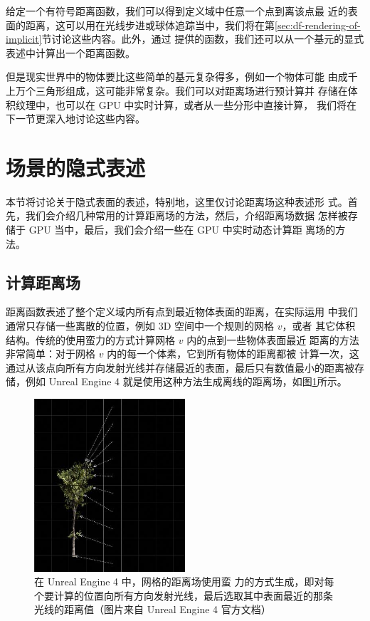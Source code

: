 给定一个有符号距离函数，我们可以得到定义域中任意一个点到离该点最 近的表面的距离，这可以用在光线步进或球体追踪当中，我们将在第\ref{sec:df-rendering-of-implicit}节讨论这些内容。此外，通过 \cite{w:distance-function} 提供的函数，我们还可以从一个基元的显式 表述中计算出一个距离函数。

但是现实世界中的物体要比这些简单的基元复杂得多，例如一个物体可能 由成千上万个三角形组成，这可能非常复杂。我们可以对距离场进行预计算并 存储在体积纹理中，也可以在 GPU 中实时计算，或者从一些分形中直接计算， 我们将在下一节更深入地讨论这些内容。



\section{场景的隐式表述}
本节将讨论关于隐式表面的表述，特别地，这里仅讨论距离场这种表述形 式。首先，我们会介绍几种常用的计算距离场的方法，然后，介绍距离场数据 怎样被存储于 GPU 当中，最后，我们会介绍一些在 GPU 中实时动态计算距 离场的方法。


\subsection{计算距离场}
距离函数表述了整个定义域内所有点到最近物体表面的距离，在实际运用 中我们通常只存储一些离散的位置，例如 3D 空间中一个规则的网格 $v$，或者 其它体积结构。传统的使用蛮力的方式计算网格 $v$ 内的点到一些物体表面最近 距离的方法非常简单：对于网格 $v$ 内的每一个体素，它到所有物体的距离都被 计算一次，这通过从该点向所有方向发射光线并存储最近的表面，最后只有数值最小的距离被存储，例如 Unreal Engine 4 就是使用这种方法生成离线的距离场，如图\ref{f:df-brute-force-method}所示。

\begin{figure}
	\sidecaption
	\includegraphics[width=0.5\textwidth]{figures/df/brute-force-method}
	\caption{在 Unreal Engine 4 中，网格的距离场使用蛮 力的方式生成，即对每个要计算的位置向所有方向发射光线，最后选取其中表面最近的那条光线的距离值（图片来自 Unreal Engine 4 官方文档）}
	\label{f:df-brute-force-method}
\end{figure}

